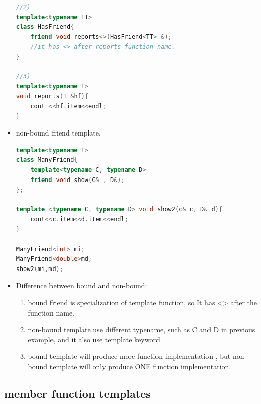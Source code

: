 \documentclass[a4paper,11pt,twoside]{book}
\begin{document}
\begin{itemize}
\begin{lstlisting}[frame=single, language=c++]
//2)
template<typename TT>
class HasFriend{
	friend void reports<>(HasFriend<TT> &);
	//it has <> after reports function name.
}
	
//3)
template<typename T>
void reports(T &hf){
	cout <<hf.item<<endl;
}
\end{lstlisting}
	
	\item non-bound friend template.
\begin{lstlisting}[frame=single, language=c++]
template<typename T>
class ManyFriend{
	template<typename C, typename D>
	friend void show(C& , D&);
};
	
template <typename C, typename D> void show2(c& c, D& d){
	cout<<c.item<<d.item<<endl;
}
	
ManyFriend<int> mi;
ManyFriend<double>md;
show2(mi,md);
\end{lstlisting}
	
	\item Difference between bound and non-bound:
	
	\begin{enumerate}
		\item bound friend is specialization of template function, so It has <> after the function name.
		
		\item non-bound template use different typename, such as C and D in previous example, and it also use template keyword
		
		\item bound template will produce more function implementation , but non-bound template will only produce ONE function implementation.
	\end{enumerate}
\end{itemize}

\subsection{member function templates}
\end{document}

